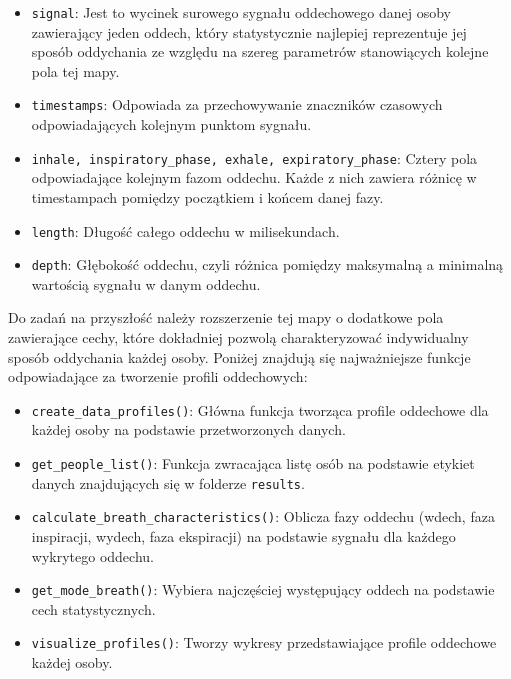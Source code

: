 \begin{itemize}
    \item \texttt{signal}: 
        Jest to wycinek surowego sygnału oddechowego danej osoby zawierający jeden oddech, który
        statystycznie najlepiej reprezentuje jej sposób oddychania ze względu na szereg parametrów 
        stanowiących kolejne pola tej mapy.
    \item \texttt{timestamps}: 
        Odpowiada za przechowywanie znaczników czasowych odpowiadających kolejnym punktom sygnału.
    \item \texttt{inhale, inspiratory\_phase, exhale, expiratory\_phase}:
        Cztery pola odpowiadające kolejnym fazom oddechu. Każde z nich zawiera różnicę w timestampach
        pomiędzy początkiem i końcem danej fazy.
    \item \texttt{length}:
        Długość całego oddechu w milisekundach.
    \item \texttt{depth}:
        Głębokość oddechu, czyli różnica pomiędzy maksymalną a minimalną wartością sygnału
        w danym oddechu.
\end{itemize}

Do zadań na przyszłość należy rozszerzenie tej mapy o dodatkowe pola zawierające cechy, które dokładniej pozwolą
charakteryzować indywidualny sposób oddychania każdej osoby. Poniżej znajdują się najważniejsze funkcje
odpowiadające za tworzenie profili oddechowych:

\begin{itemize}
    \item \texttt{create\_data\_profiles()}: 
        Główna funkcja tworząca profile oddechowe dla każdej osoby na podstawie przetworzonych danych.
    \item \texttt{get\_people\_list()}: 
        Funkcja zwracająca listę osób na podstawie etykiet danych znajdujących się w folderze \texttt{results}.
    \item \texttt{calculate\_breath\_characteristics()}: 
        Oblicza fazy oddechu (wdech, faza inspiracji, wydech, faza ekspiracji) na podstawie sygnału dla każdego 
        wykrytego oddechu.
    \item \texttt{get\_mode\_breath()}:
        Wybiera najczęściej występujący oddech na podstawie cech statystycznych.
    \item \texttt{visualize\_profiles()}:
        Tworzy wykresy przedstawiające profile oddechowe każdej osoby.
\end{itemize}


